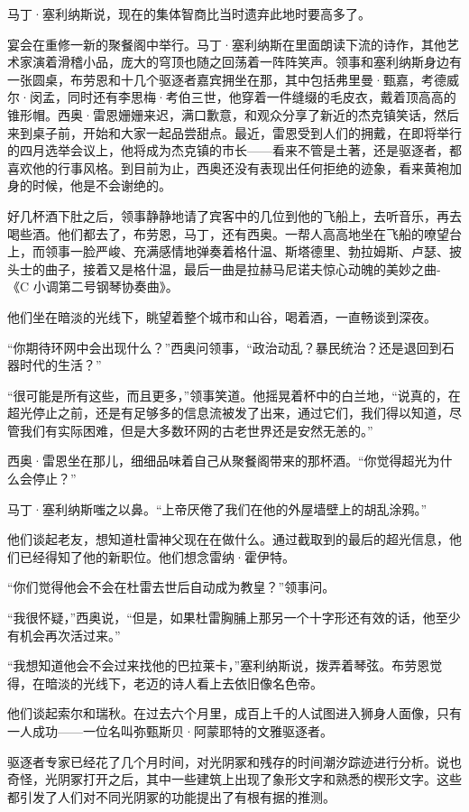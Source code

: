 \documentclass[AutoFakeBold=true]{book}
\begin{document}
马丁·塞利纳斯说，现在的集体智商比当时遗弃此地时要高多了。

宴会在重修一新的聚餐阁中举行。马丁·塞利纳斯在里面朗读下流的诗作，其他艺术家演着滑稽小品，庞大的穹顶也随之回荡着一阵阵笑声。领事和塞利纳斯身边有一张圆桌，布劳恩和十几个驱逐者嘉宾拥坐在那，其中包括弗里曼·甄嘉，考德威尔·闵孟，同时还有李思梅·考伯三世，他穿着一件缝缀的毛皮衣，戴着顶高高的锥形帽。西奥·雷恩姗姗来迟，满口歉意，和观众分享了新近的杰克镇笑话，然后来到桌子前，开始和大家一起品尝甜点。最近，雷恩受到人们的拥戴，在即将举行的四月选举会议上，他将成为杰克镇的市长——看来不管是土著，还是驱逐者，都喜欢他的行事风格。到目前为止，西奥还没有表现出任何拒绝的迹象，看来黄袍加身的时候，他是不会谢绝的。

好几杯酒下肚之后，领事静静地请了宾客中的几位到他的飞船上，去听音乐，再去喝些酒。他们都去了，布劳恩，马丁，还有西奥。一帮人高高地坐在飞船的嘹望台上，而领事一脸严峻、充满感情地弹奏着格什温、斯塔德里、勃拉姆斯、卢瑟、披头士的曲子，接着又是格什温，最后一曲是拉赫马尼诺夫惊心动魄的美妙之曲-《C 小调第二号钢琴协奏曲》。

他们坐在暗淡的光线下，眺望着整个城市和山谷，喝着酒，一直畅谈到深夜。

``你期待环网中会出现什么？''西奥问领事，``政治动乱？暴民统治？还是退回到石器时代的生活？''

``很可能是所有这些，而且更多，''领事笑道。他摇晃着杯中的白兰地，``说真的，在超光停止之前，还是有足够多的信息流被发了出来，通过它们，我们得以知道，尽管我们有实际困难，但是大多数环网的古老世界还是安然无恙的。''

西奥·雷恩坐在那儿，细细品味着自己从聚餐阁带来的那杯酒。``你觉得超光为什么会停止？''

马丁·塞利纳斯嗤之以鼻。``上帝厌倦了我们在他的外屋墙壁上的胡乱涂鸦。''

他们谈起老友，想知道杜雷神父现在在做什么。通过截取到的最后的超光信息，他们已经得知了他的新职位。他们想念雷纳·霍伊特。

``你们觉得他会不会在杜雷去世后自动成为教皇？''领事问。

``我很怀疑，''西奥说，``但是，如果杜雷胸脯上那另一个十字形还有效的话，他至少有机会再次活过来。''

``我想知道他会不会过来找他的巴拉莱卡，''塞利纳斯说，拨弄着琴弦。布劳恩觉得，在暗淡的光线下，老迈的诗人看上去依旧像名色帝。

他们谈起索尔和瑞秋。在过去六个月里，成百上千的人试图进入狮身人面像，只有一人成功——一位名叫弥甄斯贝·阿蒙耶特的文雅驱逐者。

驱逐者专家已经花了几个月时间，对光阴冢和残存的时间潮汐踪迹进行分析。说也奇怪，光阴冢打开之后，其中一些建筑上出现了象形文字和熟悉的楔形文字。这些都引发了人们对不同光阴冢的功能提出了有根有据的推测。
\end{document}
